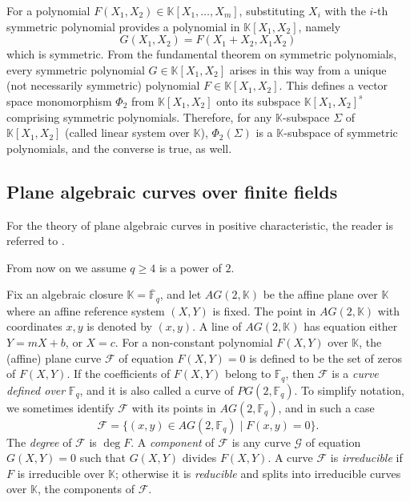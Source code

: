 \documentclass[sn-mathphys-num]{sn-jnl}%
\begin{document}
For a polynomial $F(X_1,X_2)\in \mathbb{K}[X_1,\ldots,X_m]$, substituting $X_i$ with the $i$-th symmetric polynomial provides a polynomial in $\mathbb{K}\left[X_1,X_2\right]$, namely
$$G\left(X_1,X_2\right)=F\left(X_1+X_2,X_1X_2\right)$$ which is symmetric. From the fundamental theorem on symmetric polynomials, every symmetric polynomial $G\in \mathbb{K}\left[X_1,X_2\right]$ arises in this way from a unique (not necessarily symmetric) polynomial $F\in \mathbb{K}\left[X_1,X_2\right]$. This defines  a vector space monomorphism $\Phi_2$ from $\mathbb{K}[X_1,X_2]$ onto its subspace $\mathbb{K}[X_1,X_2]^s$ comprising symmetric polynomials. Therefore, for any $\mathbb{K}$-subspace $\Sigma$ of $\mathbb{K}[X_1,X_2]$ (called linear system over $\mathbb{K}$), $\Phi_2(\Sigma)$ is a $\mathbb{K}$-subspace of symmetric polynomials, and the converse is true, as well.
\subsection{Plane algebraic curves over finite fields}
\label{av} For the theory of plane algebraic curves in positive characteristic, the reader is referred to \cite[Chapters 1-5]{HKT}.

From now on we assume $q\ge 4$ is a power of $2$.

Fix an algebraic closure $\mathbb{K}=\overline{\mathbb{F}}_q$, and let $AG(2, \mathbb{K})$ be the affine plane over $\mathbb{K}$ where an affine reference system $(X,Y)$ is fixed.  The point in $AG(2,\mathbb{K})$ with coordinates $x,y$ is denoted by $(x,y)$. A line of $AG(2,\mathbb{K})$ has equation either $Y=mX+b$, or $X=c$.
For a non-constant polynomial $F(X,Y)$ over $\mathbb{K}$, the (affine) plane curve $\mathcal F$ of equation $F(X,Y)=0$ is defined to be the set of zeros of $F(X,Y)$. If the coefficients of $F(X,Y)$ belong to $\mathbb{F}_q$, then $\mathcal{F}$ is a \emph{curve defined over} $\mathbb{F}_q$, and it is also called a curve of $PG(2,\mathbb{F}_q)$. To simplify notation, we sometimes identify $\mathcal F$ with its points in $AG(2,\mathbb{F}_q)$, and in such a case
\[\mathcal{F}=\{(x, y)\in AG(2,\mathbb{F}_q)\mid F(x, y) = 0\}.\]
The \textit{degree} of $\mathcal{F}$ is $\deg F$. A \textit{component} of $\mathcal F$ is any curve $\mathcal{G}$ of equation $G(X,Y)=0$ such that $G(X,Y)$ divides $F(X,Y)$. A curve $\mathcal F$ is \textit{irreducible} if $F$ is irreducible over $\mathbb{K}$; otherwise it is \textit{reducible} and splits into irreducible curves over $\mathbb{K}$, the components of $\mathcal{F}$.
\end{document}
